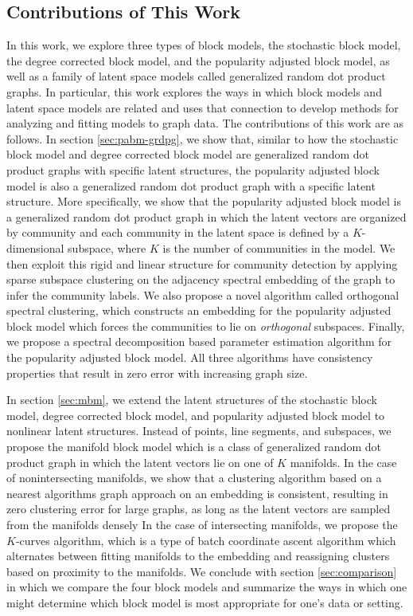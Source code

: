 \documentclass[
  12pt,
]{article}
\theoremstyle{definition}
\theoremstyle{definition}
\theoremstyle{definition}
\theoremstyle{definition}
\theoremstyle{remark}
\begin{document}
\hypertarget{contributions-of-this-work}{%
\subsection{Contributions of This Work}\label{contributions-of-this-work}}

In this work, we explore three types of block models, the stochastic block model, the degree corrected block model, and the popularity adjusted block model, as well as a family of latent space models called generalized random dot product graphs.
In particular, this work explores the ways in which block models and latent space models are related and uses that connection to develop methods for analyzing and fitting models to graph data.
The contributions of this work are as follows.
In section \ref{sec:pabm-grdpg}, we show that, similar to how the stochastic block model and degree corrected block model are generalized random dot product graphs with specific latent structures, the popularity adjusted block model is also a generalized random dot product graph with a specific latent structure.
More specifically, we show that the popularity adjusted block model is a generalized random dot product graph in which the latent vectors are organized by community and each community in the latent space is defined by a \(K\)-dimensional subspace, where \(K\) is the number of communities in the model.
We then exploit this rigid and linear structure for community detection by applying sparse subspace clustering on the adjacency spectral embedding of the graph to infer the community labels.
We also propose a novel algorithm called orthogonal spectral clustering, which constructs an embedding for the popularity adjusted block model which forces the communities to lie on \emph{orthogonal} subspaces.
Finally, we propose a spectral decomposition based parameter estimation algorithm for the popularity adjusted block model.
All three algorithms have consistency properties that result in zero error with increasing graph size.

In section \ref{sec:mbm}, we extend the latent structures of the stochastic block model, degree corrected block model, and popularity adjusted block model to nonlinear latent structures.
Instead of points, line segments, and subspaces, we propose the manifold block model which is a class of generalized random dot product graph in which the latent vectors lie on one of \(K\) manifolds.
In the case of nonintersecting manifolds, we show that a clustering algorithm based on a nearest algorithms graph approach on an embedding is consistent, resulting in zero clustering error for large graphs, as long as the latent vectors are sampled from the manifolds densely
In the case of intersecting manifolds, we propose the \(K\)-curves algorithm, which is a type of batch coordinate ascent algorithm which alternates between fitting manifolds to the embedding and reassigning clusters based on proximity to the manifolds.
We conclude with section \ref{sec:comparison} in which we compare the four block models and summarize the ways in which one might determine which block model is most appropriate for one's data or setting.
\end{document}
